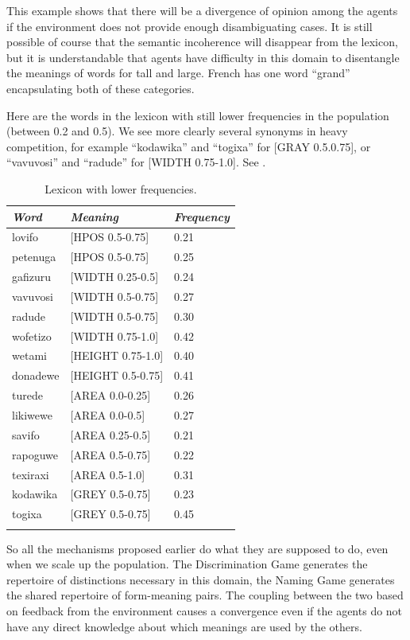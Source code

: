 This example shows that there will be a divergence of 
opinion among the agents if the environment does not 
provide enough 
disambiguating cases. It is still possible of course that 
the semantic incoherence will disappear from the lexicon, 
but it is understandable that agents have difficulty 
in this domain to disentangle the meanings of words for 
tall and large. French has one word ``grand'' encapsulating
both of these categories.

Here are the words in the lexicon with still lower 
frequencies in the population (between 0.2 and 0.5). We see
more clearly several synonyms in heavy competition, for example 
``kodawika'' and ``togixa'' for [GRAY 0.5.0.75], or 
``vavuvosi'' and ``radude'' for [WIDTH 0.75-1.0]. See . 


\begin{table}
\begin{center}
\begin{tabular}{ l  l  l }
\lsptoprule
{\itshape Word}&{\itshape Meaning} & {\itshape Frequency} \\ \midrule
lovifo & [HPOS 0.5-0.75] & 0.21 \\ 
petenuga & [HPOS 0.5-0.75] & 0.25 \\ 
gafizuru & [WIDTH 0.25-0.5] & 0.24 \\ 
vavuvosi & [WIDTH 0.5-0.75] & 0.27 \\ 
radude & [WIDTH 0.5-0.75] & 0.30 \\ 
wofetizo & [WIDTH 0.75-1.0] & 0.42 \\ 
wetami & [HEIGHT 0.75-1.0] & 0.40 \\ 
donadewe & [HEIGHT 0.5-0.75] & 0.41 \\ 
turede & [AREA 0.0-0.25] & 0.26 \\ 
likiwewe & [AREA 0.0-0.5] & 0.27 \\ 
savifo & [AREA 0.25-0.5] & 0.21 \\ 
rapoguwe & [AREA 0.5-0.75] & 0.22 \\ 
texiraxi & [AREA 0.5-1.0] & 0.31 \\ 
kodawika & [GREY 0.5-0.75] & 0.23 \\ 
togixa & [GREY 0.5-0.75] & 0.45 \\ 
\lspbottomrule
\end{tabular}
\caption{\label{tab:comp} Lexicon with lower frequencies.}
\end{center}
\end{table}

So all the mechanisms proposed earlier 
do what they are supposed to do, even when we 
scale up the population. The Discrimination 
Game generates the repertoire of distinctions 
necessary in this domain, the Naming Game generates
the shared repertoire of form-meaning pairs. The 
coupling between the two based on feedback from 
the environment causes a convergence even if the
agents do not have any direct knowledge about 
which meanings are used by the others. 

